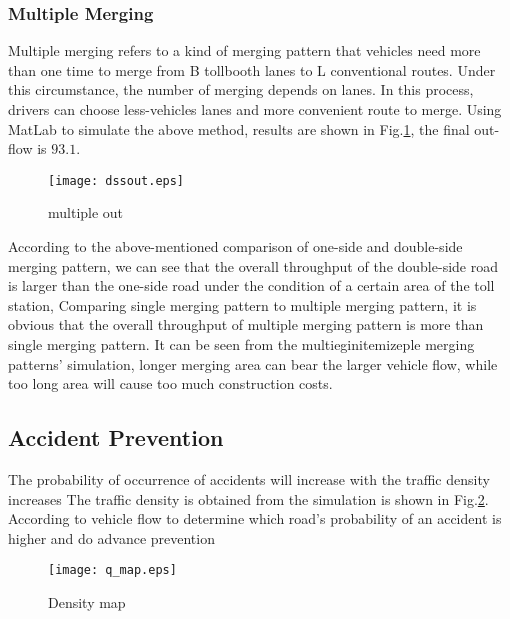 \documentclass{mcmthesis}
\begin{document}
\subsubsection{Multiple Merging}
Multiple merging refers to a kind of merging pattern that vehicles need more than one time to merge from B tollbooth lanes to L conventional routes. Under this circumstance, the number of merging depends on lanes. In this process, drivers can choose less-vehicles lanes and more convenient route to merge. Using MatLab to simulate the above method, results are shown in Fig.\ref{fig:multiple_out}, the final out-flow is $93.1$.
\begin{figure}[!htbp]
	\small
	\centering
	\texttt{[image: dssout.eps]}
	\caption{\label{fig:multiple_out}multiple out} 
\end{figure}

According to the above-mentioned comparison of one-side and double-side merging pattern, we can see that the overall throughput of the double-side road is larger than the one-side road under the condition of a certain area of the toll station, Comparing single merging pattern to multiple merging pattern, it is obvious that the overall throughput of multiple merging pattern is more than single merging pattern. It can be seen from the multiegin{itemize}ple merging patterns’ simulation, longer merging area can bear the larger vehicle flow, while too long area will cause too much construction costs.

\subsection{Accident Prevention}

The probability of occurrence of accidents will increase with the traffic density increases\cite{zhou1997relationship} The traffic density is obtained from the simulation is shown in Fig.\ref{fig:q_map}. According to vehicle flow to determine which road’s probability of an accident is higher and do advance prevention
\begin{figure}[!htbp]
	\small
	\centering
	\texttt{[image: q\_map.eps]}
	\caption{\label{fig:q_map}Density map} 
\end{figure}
\end{document}
